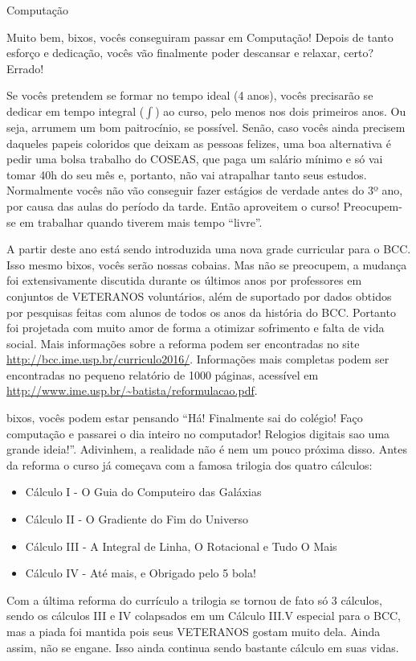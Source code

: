 \begin{subsecao}{Computação}

Muito bem, bixos, vocês conseguiram passar em Computação! Depois de tanto esforço
e dedicação, vocês vão finalmente poder descansar e relaxar, certo? Errado!

Se vocês pretendem se formar no tempo ideal (4 anos), vocês precisarão se
dedicar em tempo integral ($\int$) ao curso, pelo menos nos dois primeiros
anos. Ou seja, arrumem um bom paitrocínio, se possível. Senão, caso vocês ainda
precisem daqueles papeis coloridos que deixam as pessoas felizes, uma boa
alternativa é pedir uma bolsa trabalho do COSEAS, que paga um salário mínimo e
só vai tomar 40h do seu mês e, portanto, não vai atrapalhar tanto seus estudos.
Normalmente vocês não vão conseguir fazer estágios de verdade antes do 3º ano,
por causa das aulas do período da tarde. Então aproveitem o curso!  Preocupem-se
em trabalhar quando tiverem mais tempo ``livre''.

A partir deste ano está sendo introduzida uma nova grade curricular para o
BCC. Isso mesmo bixos, vocês serão nossas cobaias. Mas não se preocupem, a
mudança foi extensivamente discutida durante os últimos anos por professores em
conjuntos de VETERANOS voluntários, além de suportado por dados obtidos por
pesquisas feitas com alunos de todos os anos da história do BCC. Portanto foi
projetada com muito amor de forma a otimizar sofrimento e falta de vida
social. Mais informações sobre a reforma podem ser encontradas no site
\url{http://bcc.ime.usp.br/curriculo2016/}. Informações mais completas podem ser
encontradas no pequeno relatório de 1000 páginas, acessível em
\url{http://www.ime.usp.br/~batista/reformulacao.pdf}.

bixos, vocês podem estar pensando ``Há! Finalmente sai do colégio! Faço
computação e passarei o dia inteiro no computador! Relogios digitais sao uma
grande ideia!''. Adivinhem, a realidade não é nem um pouco próxima disso. Antes
da reforma o curso já começava com a famosa trilogia dos quatro cálculos:
\begin{itemize}
\item Cálculo I - O Guia do Computeiro das Galáxias
\item Cálculo II - O Gradiente do Fim do Universo
\item Cálculo III - A Integral de Linha, O Rotacional e Tudo O Mais
\item Cálculo IV - Até mais, e Obrigado pelo 5 bola!
\end{itemize}
Com a última reforma do currículo a trilogia se tornou de fato só 3 cálculos,
sendo os cálculos III e IV colapsados em um Cálculo III.V especial para o BCC,
mas a piada foi mantida pois seus VETERANOS gostam muito dela. Ainda assim, não
se engane. Isso ainda continua sendo bastante cálculo em suas vidas.


\end{subsecao}
